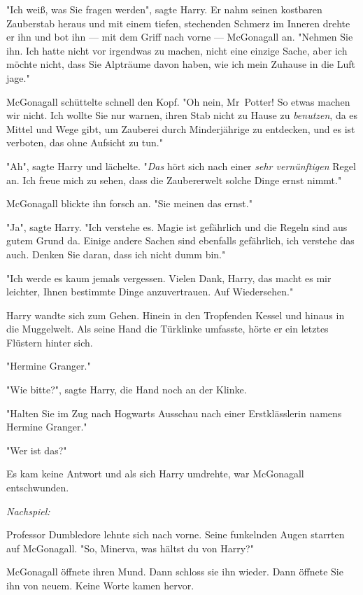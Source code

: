 {"Ich weiß, was Sie fragen werden", sagte Harry. Er nahm seinen kostbaren Zauberstab heraus und mit einem tiefen, stechenden Schmerz im Inneren drehte er ihn und bot ihn --- mit dem Griff nach vorne --- McGonagall an. "Nehmen Sie ihn. Ich hatte nicht vor irgendwas zu machen, nicht eine einzige Sache, aber ich möchte nicht, dass Sie Alpträume davon haben, wie ich mein Zuhause in die Luft jage."

McGonagall schüttelte schnell den Kopf. "Oh nein, Mr~Potter! So etwas machen wir nicht. Ich wollte Sie nur warnen, ihren Stab nicht zu Hause zu \emph{benutzen}, da es Mittel und Wege gibt, um Zauberei durch Minderjährige zu entdecken, und es ist verboten, das ohne Aufsicht zu tun."

"Ah", sagte Harry und lächelte. "\emph{Das} hört sich nach einer \emph{sehr vernünftigen} Regel an. Ich freue mich zu sehen, dass die Zaubererwelt solche Dinge ernst nimmt."

McGonagall blickte ihn forsch an. "Sie meinen das ernst."

"Ja", sagte Harry. "Ich verstehe es. Magie ist gefährlich und die Regeln sind aus gutem Grund da. Einige andere Sachen sind ebenfalls gefährlich, ich verstehe das auch. Denken Sie daran, dass ich nicht dumm bin."

"Ich werde es kaum jemals vergessen. Vielen Dank, Harry, das macht es mir leichter, Ihnen bestimmte Dinge anzuvertrauen. Auf Wiedersehen."

Harry wandte sich zum Gehen. Hinein in den Tropfenden Kessel und hinaus in die Muggelwelt. Als seine Hand die Türklinke umfasste, hörte er ein letztes Flüstern hinter sich.

"Hermine Granger."

"Wie bitte?", sagte Harry, die Hand noch an der Klinke.

"Halten Sie im Zug nach Hogwarts Ausschau nach einer Erstklässlerin namens Hermine Granger."

"Wer ist das?"

Es kam keine Antwort und als sich Harry umdrehte, war McGonagall entschwunden.

\later

\emph{Nachspiel:}

Professor Dumbledore lehnte sich nach vorne. Seine funkelnden Augen starrten auf McGonagall. "So, Minerva, was hältst du von Harry?"

McGonagall öffnete ihren Mund. Dann schloss sie ihn wieder. Dann öffnete Sie ihn von neuem. Keine Worte kamen hervor.

}
